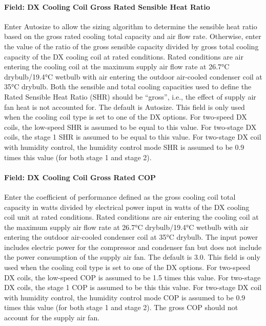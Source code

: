 \paragraph{Field: DX Cooling Coil Gross Rated Sensible Heat Ratio}\label{field-dx-cooling-coil-gross-rated-sensible-heat-ratio-1}

Enter Autosize to allow the sizing algorithm to determine the sensible heat ratio based on the gross rated cooling total capacity and air flow rate. Otherwise, enter the value of the ratio of the gross sensible capacity divided by gross total cooling capacity of the DX cooling coil at rated conditions. Rated conditions are air entering the cooling coil at the maximum supply air flow rate at 26.7°C drybulb/19.4°C wetbulb with air entering the outdoor air-cooled condenser coil at 35°C drybulb. Both the sensible and total cooling capacities used to define the Rated Sensible Heat Ratio (SHR) should be ``gross'', i.e., the effect of supply air fan heat is not accounted for. The default is Autosize. This field is only used when the cooling coil type is set to one of the DX options. For two-speed DX coils, the low-speed SHR is assumed to be equal to this value. For two-stage DX coils, the stage 1 SHR is assumed to be equal to this value. For two-stage DX coil with humidity control, the humidity control mode SHR is assumed to be 0.9 times this value (for both stage 1 and stage 2).

\paragraph{Field: DX Cooling Coil Gross Rated COP}\label{field-dx-cooling-coil-gross-rated-cop-1}

Enter the coefficient of performance defined as the gross cooling coil total capacity in watts divided by electrical power input in watts of the DX cooling coil unit at rated conditions. Rated conditions are air entering the cooling coil at the maximum supply air flow rate at 26.7°C drybulb/19.4°C wetbulb with air entering the outdoor air-cooled condenser coil at 35°C drybulb. The input power includes electric power for the compressor and condenser fan but does not include the power consumption of the supply air fan. The default is 3.0. This field is only used when the cooling coil type is set to one of the DX options. For two-speed DX coils, the low-speed COP is assumed to be 1.5 times this value. For two-stage DX coils, the stage 1 COP is assumed to be this this value. For two-stage DX coil with humidity control, the humidity control mode COP is assumed to be 0.9 times this value (for both stage 1 and stage 2). The gross COP should not account for the supply air fan.


